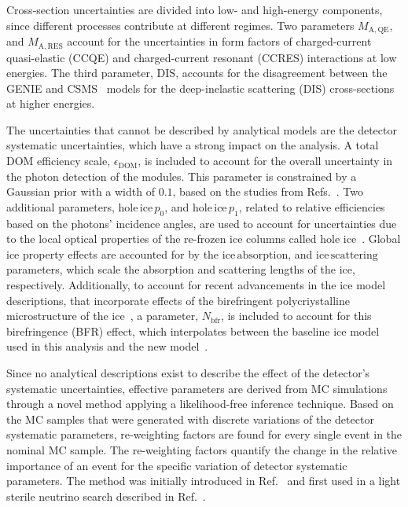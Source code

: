 \documentclass[
    aps,
    prd,
    reprint,
    amsmath,
    amssymb,
    nofootinbib,
    linenumbers,
    superscriptaddress,
    floatfix
]{revtex4-2}
\renewcommand{\rm}{\mathrm}
\newcommand{\rm}{\mathrm}
\begin{document}
Cross-section uncertainties are divided into low- and high-energy components, since different processes contribute at different regimes.
Two parameters $M_\rm{A,QE}$, and $M_\rm{A,RES}$ account for the uncertainties in form factors of charged-current quasi-elastic (CCQE) and charged-current resonant (CCRES) interactions at low energies.
The third parameter, $\rm{DIS}$, accounts for the disagreement between the \textsc{GENIE} and CSMS~\cite{csms} models for the deep-inelastic scattering (DIS) cross-sections at higher energies.

The uncertainties that cannot be described by analytical models are the detector systematic uncertainties, which have a strong impact on the analysis.
A total DOM efficiency scale, $\epsilon_{\rm{DOM}}$, is included to account for the overall uncertainty in the photon detection of the modules.
This parameter is constrained by a Gaussian prior with a width of $0.1$, based on the studies from Refs.~\cite{JFeintzeig_phd, domeff_nick}.
Two additional parameters, $\rm{hole \, ice} \, p_0$, and $\rm{hole \, ice} \, p_1$, related to relative efficiencies based on the photons' incidence angles, are used to account for uncertainties due to the local optical properties of the re-frozen ice columns called hole ice~\cite{Eller:2023ko}.
Global ice property effects are accounted for by the $\rm{ice \, absorption}$, and $\rm{ice \, scattering}$ parameters, which scale the absorption and scattering lengths of the ice, respectively.
Additionally, to account for recent advancements in the ice model descriptions, that incorporate effects of the birefringent polycriystalline microstructure of the ice~\cite{bfr_ice_tc-18-75-2024}, a parameter, $N_\rm{bfr}$, is included to account for this birefringence (BFR) effect, which interpolates between the baseline ice model used in this analysis and the new model~\cite{IceCube:2024xjj}.

Since no analytical descriptions exist to describe the effect of the detector's systematic uncertainties, effective parameters are derived from MC simulations through a novel method applying a likelihood-free inference technique.
Based on the MC samples that were generated with discrete variations of the detector systematic parameters, re-weighting factors are found for every single event in the nominal MC sample.
The re-weighting factors quantify the change in the relative importance of an event for the specific variation of detector systematic parameters. The method was initially introduced in Ref.~\cite{Fischer_2023} and first used in a light sterile neutrino search described in Ref.~\cite{Abbasi:2024ktc}.
\end{document}
